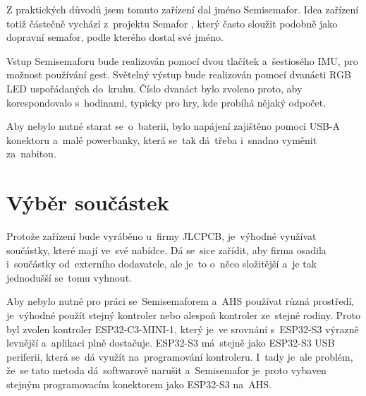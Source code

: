 


Z praktických důvodů jsem tomuto zařízení dal jméno Semisemafor.
Idea zařízení totiž částečně vychází z~projektu Semafor \cite{StarySemafor}, který často sloužit podobně jako dopravní semafor, podle kterého dostal své jméno.

Vstup Semisemaforu bude realizován pomocí dvou tlačítek a~šestiosého IMU, pro možnost používání gest.
Světelný výstup bude realizován pomocí dvanácti RGB LED uspořádaných do~kruhu.
Číslo dvanáct bylo zvoleno proto, aby korespondovalo s~hodinami, typicky pro hry, kde probíhá nějaký odpočet.

Aby nebylo nutné starat se~o~baterii, bylo napájení zajištěno pomocí USB-A konektoru a~malé powerbanky, která se~tak dá~třeba i~snadno vyměnit za~nabitou.

\section{Výběr součástek}
Protože zařízení bude vyráběno u~firmy JLCPCB, je~výhodné využívat součástky, které mají ve~své nabídce.
Dá se~sice zařídit, aby firma osadila i~součástky od~externího dodavatele, ale je~to o~něco složitější a~je tak jednodušší se~tomu vyhnout.

Aby nebylo nutné pro práci se~Semisemaforem a~AHS používat různá prostředí, je~výhodné použít stejný kontroler nebo alespoň kontroler ze~stejné rodiny.
Proto byl zvolen kontroler ESP32-C3-MINI-1, který je~ve srovnání s~ESP32-S3 výrazně levnější a~aplikaci plně dostačuje. 
ESP32-S3 má~stejně jako ESP32-S3 USB periferii, která se~dá využít na~programování kontroleru.
I~tady je~ale problém, že~se tato metoda dá~softwarově narušit a~Semisemafor je~proto vybaven stejným programovacím konektorem jako ESP32-S3 na~AHS.

